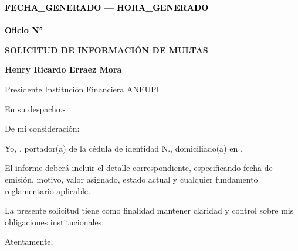 \documentclass[a4paper,12pt]{article}
\begin{document}
\pagestyle{empty}

\vspace*{-5.5cm}
\begin{flushright}
{\footnotesize \textcolor{black}{\textbf{{{FECHA_GENERADO}} --- {{{HORA_GENERADO}}}}}} \\[-10pt] %
{\footnotesize \textcolor{black}{\underline{\hspace{7.5cm}}}} \\[-2pt] %
{\footnotesize \textcolor{black}{\textbf{Oficio N° }}} 
\end{flushright}


\vspace{2.5cm}
\noindent
\hspace*{\dimexpr\textwidth+1cm\relax}


\begin{center}
    \textbf{\large SOLICITUD DE INFORMACIÓN DE MULTAS}
\end{center}

\vspace{0.8cm}

\noindent \textbf{Henry Ricardo Erraez Mora} 

\noindent Presidente Institución Financiera ANEUPI 

\noindent En su despacho.-

\vspace{1cm}

\noindent De mi consideración:

\noindent Yo, \textbf{\underline{\hspace{6cm}}}, portador(a) de la cédula de identidad N.\textbf{\underline{\hspace{4cm}}}, domiciliado(a) en \textbf{\underline{\hspace{8cm}}}, 

\vspace{0.5cm}

\noindent
\textbf{\underline{\hspace{6cm}}}

\vspace{0.5cm}

\noindent
El informe deberá incluir el detalle correspondiente, especificando fecha de emisión, motivo, valor asignado, estado actual y cualquier fundamento reglamentario aplicable.

\vspace{0.5cm}

\noindent
La presente solicitud tiene como finalidad mantener claridad y control sobre mis obligaciones institucionales.

\noindent Atentamente,

\vspace{2.5cm}


\noindent{}  

\noindent{}      

\noindent{}  

\noindent{} 
\end{document}
